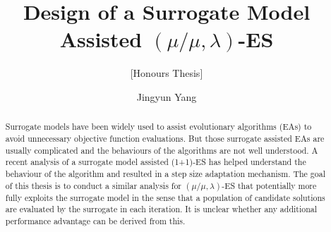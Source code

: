 \documentclass[sig-alternate,natbib=false]{acmart}
\begin{document}
\title{Design of a Surrogate Model Assisted $(\mu/\mu,\lambda)$-ES}
\subtitle{[Honours Thesis]}


\author{Jingyun Yang }
\orcid{}







\begin{abstract}
Surrogate models have been widely used to assist evolutionary algorithms (EAs) to avoid unnecessary objective function evaluations. But those surrogate assisted EAs are usually complicated and the behaviours of the algorithms are not well understood. A recent analysis of a surrogate model assisted (1+1)-ES has helped understand the behaviour of the algorithm and resulted in a step size adaptation mechanism. The goal of this thesis is to conduct a similar analysis for $(\mu/\mu,\lambda)$-ES that potentially more fully exploits the surrogate model in the sense that a population of candidate solutions are evaluated by the surrogate in each iteration. It is unclear whether any additional performance advantage can be derived from this. 
\end{abstract}
\end{document}
